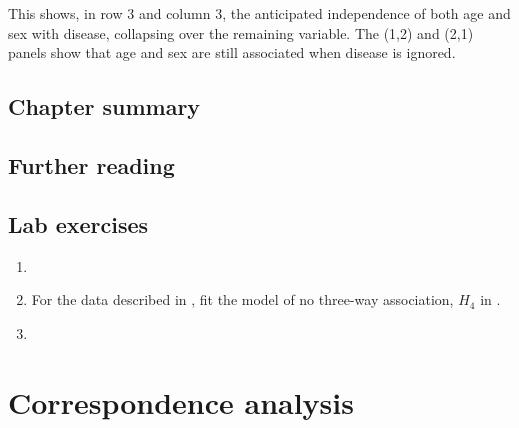 \documentclass[11pt]{book}\usepackage[]{graphicx}\usepackage[]{color}
\begin{document}
This shows, in row 3 and column 3, the anticipated independence of both age and sex with
disease, collapsing over the remaining variable.  
The (1,2) and (2,1) panels show that age and sex are still associated
when disease is ignored.

\section{Chapter summary}\label{sec:mosaic-summary}


\section{Further reading}\label{sec:mosaic-reading}

\section{Lab exercises}\label{sec:mosaic-lab}

\begin{enumerate}

\item  

\item For the  data described in , fit the model of no three-way
association, $H_4$ in . 

\item

\end{enumerate}






\chapter{Correspondence analysis}\label{ch:corresp}

\end{document}
